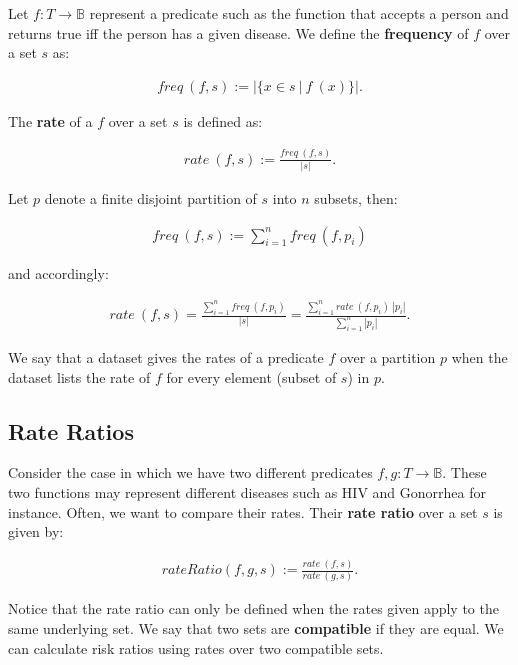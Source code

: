 \documentclass[]{article}
\begin{document}
Let \(f : T \rightarrow \mathbb{B}\) represent a predicate such as the
function that accepts a person and returns true iff the person has a
given disease. We define the \textbf{frequency} of \(f\) over a set
\(s\) as:

\begin{align*}
freq\ (f, s) := |\{x \in s\ |\ f\ (x)\}|.
\end{align*}

The \textbf{rate} of a \(f\) over a set \(s\) is defined as:

\begin{align*}
rate\ (f, s) := \frac{freq\ (f, s)}{|s|}.
\end{align*}

Let \(p\) denote a finite disjoint partition of \(s\) into \(n\)
subsets, then:

\begin{align*}
freq\ (f, s) := \sum_{i=1}^n freq\ (f, p_i)
\end{align*}

and accordingly:

\begin{align}
rate\ (f, s) = \frac{\sum_{i=1}^n freq\ (f, p_i)}{|s|} = \frac{\sum_{i=1}^n rate\ (f, p_i)\ |p_i|}{\sum_{i=1}^n|p_i|}.
\end{align}

We say that a dataset gives the rates of a predicate \(f\) over a
partition \(p\) when the dataset lists the rate of \(f\) for every
element (subset of \(s\)) in \(p\).

\hypertarget{rate-ratios}{%
\subsection{Rate Ratios}\label{rate-ratios}}

Consider the case in which we have two different predicates
\(f, g: T \rightarrow \mathbb{B}\). These two functions may represent
different diseases such as HIV and Gonorrhea for instance. Often, we
want to compare their rates. Their \textbf{rate ratio} over a set \(s\)
is given by:

\begin{align*}
rateRatio (f, g, s) := \frac{rate\ (f, s)}{rate\ (g, s)}.
\end{align*}

Notice that the rate ratio can only be defined when the rates given
apply to the same underlying set. We say that two sets are
\textbf{compatible} if they are equal. We can calculate risk ratios
using rates over two compatible sets.
\end{document}
